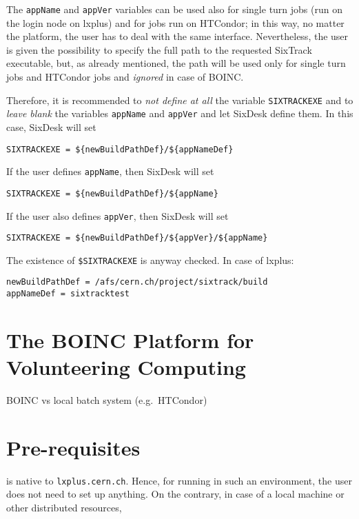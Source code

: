 The \texttt{appName} and \texttt{appVer} variables can be used
also for single turn jobs (run on the login node on lxplus)
and for jobs run on HTCondor; in this way, no matter the platform,
the user has to deal with the same interface. Nevertheless,
the user is given the possibility to specify the full path to
the requested SixTrack executable, but, as already mentioned, the
path will be used only for single turn jobs and HTCondor jobs and
\emph{ignored} in case of BOINC.

Therefore, it is recommended to \emph{not define at all}
the variable \texttt{SIXTRACKEXE} and to \emph{leave blank}
the variables \texttt{appName} and \texttt{appVer} and let
SixDesk define them. In this case, SixDesk will set
\begin{lstlisting}
SIXTRACKEXE = ${newBuildPathDef}/${appNameDef}
\end{lstlisting}
If the user defines \texttt{appName}, then SixDesk will set
\begin{lstlisting}
SIXTRACKEXE = ${newBuildPathDef}/${appName}
\end{lstlisting}
If the user also defines \texttt{appVer}, then SixDesk will set
\begin{lstlisting}
SIXTRACKEXE = ${newBuildPathDef}/${appVer}/${appName}
\end{lstlisting}
The existence of \texttt{\${SIXTRACKEXE}} is anyway checked.
In case of lxplus:
\begin{lstlisting}
newBuildPathDef = /afs/cern.ch/project/sixtrack/build
appNameDef = sixtracktest
\end{lstlisting}

\section{The BOINC Platform for Volunteering Computing}
BOINC vs local batch system (e.g.~HTCondor)

\section{Pre-requisites}
\SIXDESK{} is native to \texttt{lxplus.cern.ch}. Hence, for running in such
an environment, the user does not need to set up anything. On the contrary,
in case of a local machine or other distributed resources,

